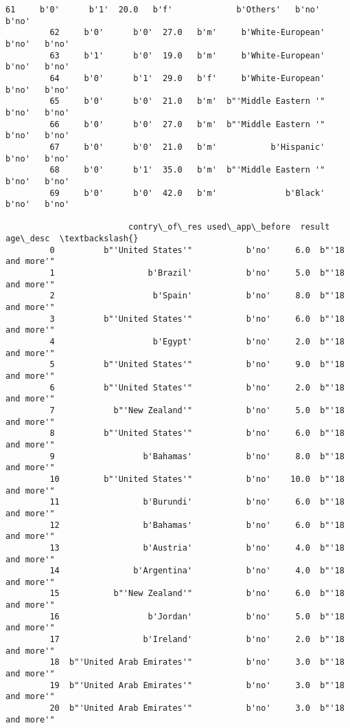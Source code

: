 \documentclass[11pt]{article}
\begin{document}
\begin{Verbatim}[commandchars=\\\{\}]
         61     b'0'      b'1'  20.0   b'f'             b'Others'   b'no'   b'no'   
         62     b'0'      b'0'  27.0   b'm'     b'White-European'   b'no'   b'no'   
         63     b'1'      b'0'  19.0   b'm'     b'White-European'   b'no'   b'no'   
         64     b'0'      b'1'  29.0   b'f'     b'White-European'   b'no'   b'no'   
         65     b'0'      b'0'  21.0   b'm'  b"'Middle Eastern '"   b'no'   b'no'   
         66     b'0'      b'0'  27.0   b'm'  b"'Middle Eastern '"   b'no'   b'no'   
         67     b'0'      b'0'  21.0   b'm'           b'Hispanic'   b'no'   b'no'   
         68     b'0'      b'1'  35.0   b'm'  b"'Middle Eastern '"   b'no'   b'no'   
         69     b'0'      b'0'  42.0   b'm'              b'Black'   b'no'   b'no'   
         
                         contry\_of\_res used\_app\_before  result          age\_desc  \textbackslash{}
         0          b"'United States'"           b'no'     6.0  b"'18 and more'"   
         1                   b'Brazil'           b'no'     5.0  b"'18 and more'"   
         2                    b'Spain'           b'no'     8.0  b"'18 and more'"   
         3          b"'United States'"           b'no'     6.0  b"'18 and more'"   
         4                    b'Egypt'           b'no'     2.0  b"'18 and more'"   
         5          b"'United States'"           b'no'     9.0  b"'18 and more'"   
         6          b"'United States'"           b'no'     2.0  b"'18 and more'"   
         7            b"'New Zealand'"           b'no'     5.0  b"'18 and more'"   
         8          b"'United States'"           b'no'     6.0  b"'18 and more'"   
         9                  b'Bahamas'           b'no'     8.0  b"'18 and more'"   
         10         b"'United States'"           b'no'    10.0  b"'18 and more'"   
         11                 b'Burundi'           b'no'     6.0  b"'18 and more'"   
         12                 b'Bahamas'           b'no'     6.0  b"'18 and more'"   
         13                 b'Austria'           b'no'     4.0  b"'18 and more'"   
         14               b'Argentina'           b'no'     4.0  b"'18 and more'"   
         15           b"'New Zealand'"           b'no'     6.0  b"'18 and more'"   
         16                  b'Jordan'           b'no'     5.0  b"'18 and more'"   
         17                 b'Ireland'           b'no'     2.0  b"'18 and more'"   
         18  b"'United Arab Emirates'"           b'no'     3.0  b"'18 and more'"   
         19  b"'United Arab Emirates'"           b'no'     3.0  b"'18 and more'"   
         20  b"'United Arab Emirates'"           b'no'     3.0  b"'18 and more'"   

\end{Verbatim}
\end{document}
